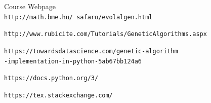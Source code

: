 \documentclass[12pt,english]{article}
\begin{document}
\begin{thebibliography}{9}

Course Webpage
\\\texttt{http://math.bme.hu/~safaro/evolalgen.html}

\texttt{http://www.rubicite.com/Tutorials/GeneticAlgorithms.aspx}

\texttt{https://towardsdatascience.com/genetic-algorithm\\-implementation-in-python-5ab67bb124a6}

\texttt{https://docs.python.org/3/}


\texttt{https://tex.stackexchange.com/}

\end{thebibliography}
\end{document}
